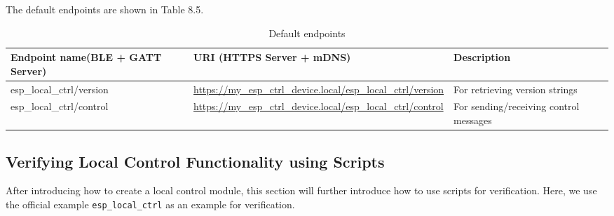 \documentclass[a4paper,12pt]{book}
\begin{document}
The default endpoints are shown in Table 8.5.

\begin{table}[h!]
    \renewcommand{\arraystretch}{1}
    \caption{Default endpoints}
    \begin{tabular}{|>{\Centering}m{10em}|>{\Centering}m{15em}|>{\Centering}m{13em}|}
        \hline
        \rowcolor{LightBlue} \textbf{Endpoint name\newline(BLE + GATT Server)}&\textbf{URI (HTTPS Server + mDNS)}&\textbf{Description}\\
        \hline
        esp\_local\_ctrl/version&\url{https://my_esp_ctrl_device.local/esp_local_ctrl/version}&For retrieving version strings\\
        \hline
        esp\_local\_ctrl/control&\url{https://my_esp_ctrl_device.local/esp_local_ctrl/control}&For sending/receiving control messages\\
        \hline
    \end{tabular}
\end{table}

\subsection{Verifying Local Control Functionality using Scripts}
After introducing how to create a local control module, this section will further introduce how to use scripts for verification. Here, we use the official example \verb|esp_local_ctrl| as an example for verification.
\end{document}
